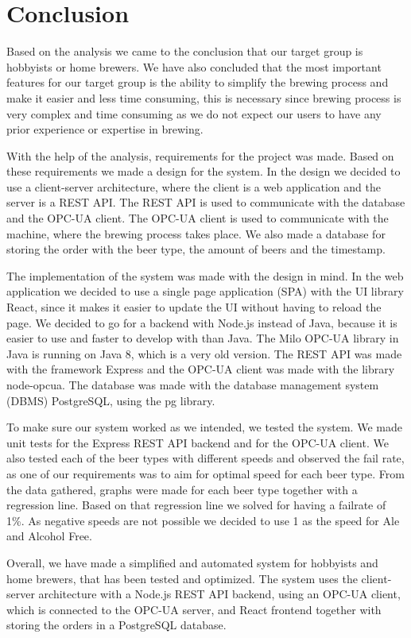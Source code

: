 \section{Conclusion}
Based on the analysis we came to the conclusion that our target group is hobbyists or home brewers.
We have also concluded that the most important features for our target group is the ability to simplify the brewing process and
make it easier and less time consuming, this is necessary since brewing process is very complex and time consuming
as we do not expect our users to have any prior experience or expertise in brewing.\newline

With the help of the analysis, requirements for the project was made.
Based on these requirements we made a design for the system.
In the design we decided to use a client-server architecture, where the client is a web application and the server is a REST API.
The REST API is used to communicate with the database and the OPC-UA client.
The OPC-UA client is used to communicate with the machine, where the brewing process takes place.
We also made a database for storing the order with the beer type, the amount of beers and the timestamp.\newline

The implementation of the system was made with the design in mind.
In the web application we decided to use a single page application (SPA) with the UI library React,
since it makes it easier to update the UI without having to reload the page.
We decided to go for a backend with Node.js instead of Java, because it is easier to use and faster to develop with than Java.
The Milo OPC-UA library in Java is running on Java 8, which is a very old version.
The REST API was made with the framework Express and the OPC-UA client was made with the library node-opcua.
The database was made with the database management system (DBMS) PostgreSQL, using the pg library.\newline

To make sure our system worked as we intended, we tested the system.
We made unit tests for the Express REST API backend and for the OPC-UA client.
We also tested each of the beer types with different speeds and observed the fail rate,
as one of our requirements was to aim for optimal speed for each beer type.
From the data gathered, graphs were made for each beer type together with a regression line.
Based on that regression line we solved for having a failrate of 1\%.
As negative speeds are not possible we decided to use 1 as the speed for Ale and Alcohol Free.\newline

Overall, we have made a simplified and automated system for hobbyists and home brewers,
that has been tested and optimized. The system uses the client-server architecture with a Node.js REST API backend,
using an OPC-UA client, which is connected to the OPC-UA server, and React frontend together with storing the orders in a PostgreSQL database.